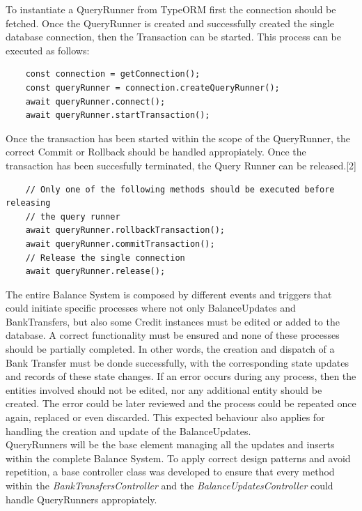 To instantiate a QueryRunner from TypeORM first the connection should be fetched. Once the QueryRunner is created and successfully created the single database connection, then the Transaction can be started. This process can be executed as follows:

\begin{verbatim}
    const connection = getConnection();
    const queryRunner = connection.createQueryRunner();
    await queryRunner.connect();
    await queryRunner.startTransaction();
\end{verbatim}

Once the transaction has been started within the scope of the QueryRunner, the correct Commit or Rollback should be handled appropiately. Once the transaction has been succesfully terminated, the Query Runner can be released.[2]

\begin{verbatim}
    // Only one of the following methods should be executed before releasing
    // the query runner
    await queryRunner.rollbackTransaction();
    await queryRunner.commitTransaction();
    // Release the single connection
    await queryRunner.release();
\end{verbatim}

The entire Balance System is composed by different events and triggers that could initiate specific processes where not only BalanceUpdates and BankTransfers, but also some Credit instances must be edited or added to the database. A correct functionality must be ensured and none of these processes should be partially completed. In other words, the creation and dispatch of a Bank Transfer must be donde successfully, with the corresponding state updates and records of these state changes. If an error occurs during any process, then the entities involved should not be edited, nor any additional entity should be created. The error could be later reviewed and the process could be repeated once again, replaced or even discarded. This expected behaviour also applies for handling the creation and update of the BalanceUpdates.\\

QueryRunners will be the base element managing all the updates and inserts within the complete Balance System. To apply correct design patterns and avoid repetition, a base controller class was developed to ensure that every method within the \textit{BankTransfersController} and the \textit{BalanceUpdatesController} could handle QueryRunners appropiately.

